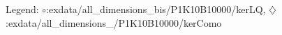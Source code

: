 Legend: {\color{NavyBlue}$\circ$}:exdata/all\_dimensions\_bis/P1K10B10000/kerLQ, {\color{Magenta}$\diamondsuit$}:exdata/all\_dimensions\_/P1K10B10000/kerComo